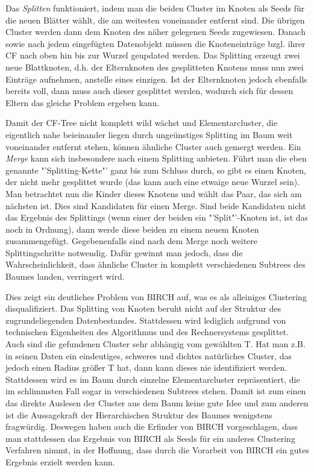 Das \textit{Splitten} funktioniert, indem man die beiden Cluster im Knoten
als Seeds für die neuen Blätter wählt, die am weitesten voneinander entfernt
sind. Die übrigen Cluster werden dann dem  Knoten des näher gelegenen
Seeds zugewiesen. Danach sowie nach jedem eingefügten Datenobjekt müssen
die Knoteneinträge bzgl. ihrer CF nach oben hin bis zur Wurzel geupdated
werden. Das Splitting erzeugt zwei neue Blattknoten, d.h. der Elternknoten
des gesplitteten Knotens muss nun zwei Einträge aufnehmen, anstelle eines
einzigen. Ist der Elternknoten jedoch ebenfalls bereits voll, dann muss auch
dieser gesplittet werden, wodurch sich für dessen Eltern das gleiche Problem
ergeben kann.

Damit der CF-Tree nicht komplett wild wächst und Elementarcluster, die
eigentlich nahe beieinander liegen durch ungeünstiges Splitting im Baum weit
voneinander entfernt stehen, können ähnliche Cluster auch gemergt werden.
Ein \textit{Merge} kann sich insbesondere nach einem Splitting anbieten.
Führt man die eben genannte "'Splitting-Kette"' ganz bis zum Schluss durch,
so gibt es einen Knoten, der nicht mehr gesplittet wurde (das kann auch eine
etwaige neue Wurzel sein). Man betrachtet nun die Kinder dieses Knotens und
wählt das Paar, das sich am nächsten ist. Dies sind Kandidaten für einen Merge.
Sind beide Kandidaten nicht das Ergebnis des Splittings (wenn einer der beiden
ein "'Split"'-Knoten ist, ist das noch in Ordnung), dann werde diese beiden
zu einem neuem Knoten zusammengefügt. Gegebenenfalls sind nach dem Merge
noch weitere Splittingschritte notwendig. Dafür gewinnt man jedoch, dass
die Wahrscheinlichkeit, dass ähnliche Cluster in komplett verschiedenen 
Subtrees des Baumes landen, verringert wird.

Dies zeigt ein deutliches Problem von BIRCH auf, was es als alleiniges 
Clustering disqualifiziert. Das Splitting von Knoten beruht nicht auf der Struktur
des zugrundeliegenden Datenbestandes. Stattdessen wird lediglich aufgrund 
von technischen Eigenheiten des Algorithmus und des Rechnersystems
gesplittet. Auch sind die gefundenen Cluster sehr abhängig vom gewählten
T. Hat man z.B. in seinen Daten ein eindeutiges, schweres und dichtes natürliches
Cluster, das jedoch einen Radius größer T hat, dann kann dieses nie identifiziert
werden. Stattdessen wird es im Baum durch einzelne Elementarcluster 
repräsentiert, die im schlimmsten Fall sogar in verschiedenen Subtrees stehen.
Damit ist zum einen das direkte Auslesen der Cluster aus dem Baum keine gute Idee 
und zum anderen ist die Aussagekraft der Hierarchischen Struktur des
Baumes wenigstens fragwürdig. Deswegen haben auch die Erfinder von BIRCH
vorgeschlagen, dass man stattdessen das Ergebnis von BIRCH als Seeds für
ein anderes Clustering Verfahren nimmt, in der Hoffnung, dass durch die
Vorarbeit von BIRCH ein gutes Ergebnis erzielt werden kann.

